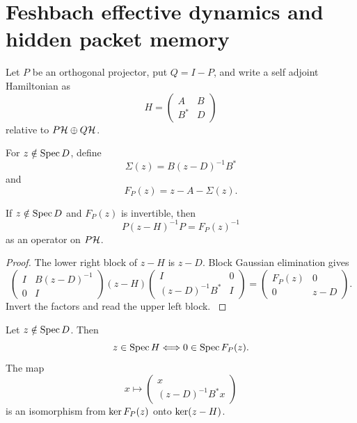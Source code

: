 \section{Feshbach effective dynamics and hidden packet memory}\label{strong:section:009}\label{strong:sec:feshbach}

Let \(P\) be an orthogonal projector, put \(Q=I-P\), and write a self adjoint Hamiltonian as
\[
H=
\begin{pmatrix}
A&B\\
B^*&D
\end{pmatrix}
\]
relative to \(P\Hcal\oplus Q\Hcal\).

\begin{definition}\label{strong:definition:007}\label{strong:def:feshbach_map}
For \(z\notin\operatorname{Spec} D\), define
\[
\Sigma(z)=B(z-D)^{-1}B^*
\]
and
\[
F_P(z)=z-A-\Sigma(z).
\]
\end{definition}

\begin{theorem}\label{strong:theorem:029}\label{strong:thm:feshbach_resolvent}
If \(z\notin\operatorname{Spec} D\) and \(F_P(z)\) is invertible, then
\[
P(z-H)^{-1}P=F_P(z)^{-1}
\]
as an operator on \(P\Hcal\).
\end{theorem}

\begin{proof}\label{strong:proof:044}
The lower right block of \(z-H\) is \(z-D\). Block Gaussian elimination gives
\[
\begin{pmatrix}
I&B(z-D)^{-1}\\
0&I
\end{pmatrix}
(z-H)
\begin{pmatrix}
I&0\\
(z-D)^{-1}B^*&I
\end{pmatrix}
=
\begin{pmatrix}
F_P(z)&0\\
0&z-D
\end{pmatrix}.
\]
Invert the factors and read the upper left block.
\label{strong:proof:044:end}\end{proof}

\begin{theorem}\label{strong:theorem:030}\label{strong:thm:feshbach_spectrum}
Let \(z\notin\operatorname{Spec} D\). Then
\[
z\in\operatorname{Spec} H
\Longleftrightarrow
0\in\operatorname{Spec} F_P(z).
\]
The map
\[
x\longmapsto
\begin{pmatrix}
x\\
(z-D)^{-1}B^*x
\end{pmatrix}
\]
is an isomorphism from \(\operatorname{ker} F_P(z)\) onto \(\operatorname{ker}(z-H)\).
\end{theorem}

